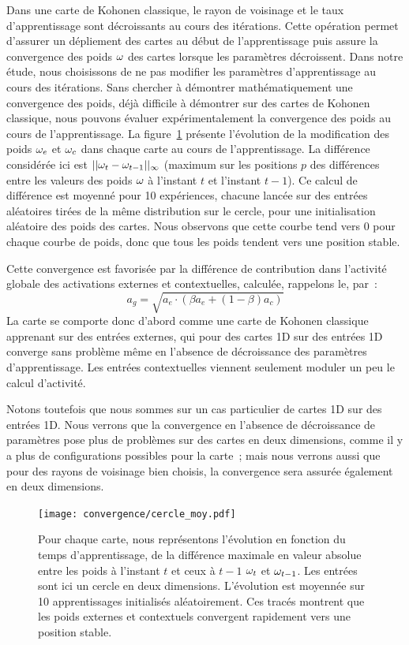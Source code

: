 \documentclass[../main]{subfiles}
\begin{document}
Dans une carte de Kohonen classique, le rayon de voisinage et le taux d'apprentissage sont décroissants au cours des itérations. Cette opération permet d'assurer un dépliement des cartes au début de l'apprentissage puis assure la convergence des poids $\omega$ des cartes lorsque les paramètres décroissent.
Dans notre étude, nous choisissons de ne pas modifier les paramètres d'apprentissage au cours des itérations.
Sans chercher à démontrer mathématiquement une convergence des poids, déjà difficile à démontrer sur des cartes de Kohonen classique, nous pouvons évaluer expérimentalement la convergence des poids au cours de l'apprentissage.
La figure~\ref{fig:conv} présente l'évolution de la modification des poids $\omega_{e}$ et $\omega_{c}$ dans chaque carte au cours de l'apprentissage. La différence considérée ici est $||\omega_t - \omega_{t-1}||_{\infty}$ (maximum sur les positions $p$ des différences entre les valeurs des poids $\omega$ à l'instant $t$ et l'instant $t-1$). Ce calcul de différence est moyenné pour 10 expériences, chacune lancée sur des entrées aléatoires tirées de la même distribution sur le cercle, pour une initialisation aléatoire des poids des cartes.
Nous observons que cette courbe tend vers $0$ pour chaque courbe de poids, donc que tous les poids tendent vers une position stable.

Cette convergence est favorisée par la différence de contribution dans l'activité globale des activations externes et contextuelles, calculée, rappelons le, par~: 
$$ a_g = \sqrt{a_e \cdot (\beta a_e + (1-\beta)a_c)}$$
La carte se comporte donc d'abord comme une carte de Kohonen classique apprenant sur des entrées externes, qui pour des cartes 1D sur des entrées 1D converge sans problème même en l'absence de décroissance des paramètres d'apprentissage. Les entrées contextuelles viennent seulement moduler un peu le calcul d'activité.

Notons toutefois que nous sommes sur un cas particulier de cartes 1D sur des entrées 1D.
Nous verrons que la convergence en l'absence de décroissance de paramètres pose plus de problèmes sur des cartes en deux dimensions, comme il y a plus de configurations possibles pour la carte~; mais nous verrons aussi que pour des rayons de voisinage bien choisis, la convergence sera assurée également en deux dimensions.

\begin{figure}
	\texttt{[image: convergence/cercle\_moy.pdf]}
	\caption{Pour chaque carte, nous représentons l'évolution en fonction du temps d'apprentissage, de la différence maximale en valeur absolue entre les poids à l'instant $t$ et ceux à $t-1$ $\omega_t$ et $\omega_{t-1}$. Les entrées sont ici un cercle en deux dimensions. L'évolution est moyennée sur 10 apprentissages initialisés aléatoirement.
	Ces tracés montrent que les poids externes et contextuels convergent rapidement vers une position stable.\label{fig:conv}}
\end{figure}
\end{document}
